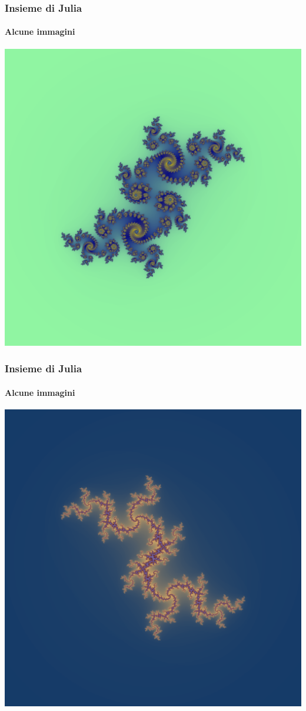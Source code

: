 \documentclass{beamer}
\begin{document}
			\begin{frame}
				\frametitle{Insieme di Julia}
				\framesubtitle{Alcune immagini}
				\begin{center}
					\includegraphics[width=0.7\linewidth]{"../Insieme di Julia/cosa55"}
				\end{center}
			\end{frame}
			\begin{frame}
				\frametitle{Insieme di Julia}
				\framesubtitle{Alcune immagini}
				\begin{center}
					\includegraphics[width=0.7\linewidth]{"../Insieme di Julia/cosa58"}
				\end{center}
			\end{frame}
\end{document}
